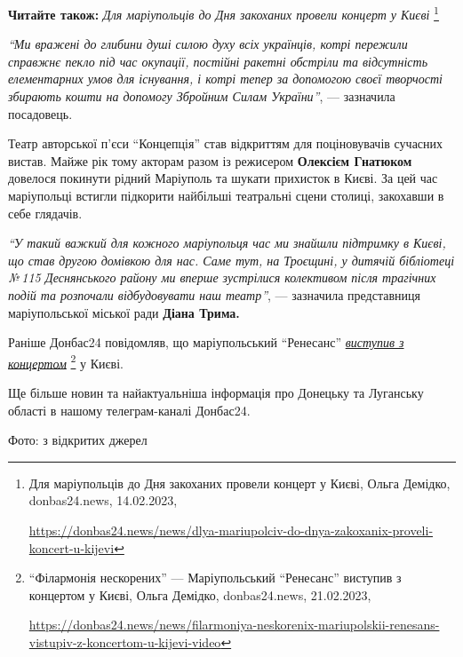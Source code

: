 \textbf{Читайте також:} \emph{Для маріупольців до Дня закоханих провели концерт у Києві}%
\footnote{Для маріупольців до Дня закоханих провели концерт у Києві, Ольга Демідко, donbas24.news, 14.02.2023, \par%
\url{https://donbas24.news/news/dlya-mariupolciv-do-dnya-zakoxanix-proveli-koncert-u-kijevi}%
}


\begin{leftbar}
\emph{\enquote{Ми вражені до глибини душі силою духу всіх українців, котрі пережили
справжнє пекло під час окупації, постійні ракетні обстріли та
відсутність елементарних умов для існування, і котрі тепер за допомогою
своєї творчості збирають кошти на допомогу Збройним Силам України}}, —
зазначила посадовець. 
\end{leftbar}


Театр авторської п'єси \enquote{Концепція} став відкриттям для поціновувачів сучасних
вистав. Майже рік тому акторам разом із режисером \textbf{Олексієм Гнатюком} довелося
покинути рідний Маріуполь та шукати прихисток в Києві. За цей час маріупольці
встигли підкорити найбільші театральні сцени столиці, закохавши в себе
глядачів.


\begin{leftbar}
\emph{\enquote{У такий важкий для кожного маріупольця час ми знайшли підтримку в Києві, що
став другою домівкою для нас. Саме тут, на Троєщині, у дитячій
бібліотеці № 115 Деснянського району ми вперше зустрілися колективом
після трагічних подій та розпочали відбудовувати наш театр}}, —
зазначила представниця маріупольської міської ради \textbf{Діана Трима.} 
\end{leftbar}


Раніше Донбас24 повідомляв, що маріупольський \enquote{Ренесанс} \href{https://donbas24.news/news/filarmoniya-neskorenix-mariupolskii-renesans-vistupiv-z-koncertom-u-kijevi-video}{\emph{виступив з концертом}}%
\footnote{\enquote{Філармонія нескорених} — Маріупольський \enquote{Ренесанс} виступив з концертом у Києві, Ольга Демідко, donbas24.news, 21.02.2023, \par\url{https://donbas24.news/news/filarmoniya-neskorenix-mariupolskii-renesans-vistupiv-z-koncertom-u-kijevi-video}}
у Києві.

Ще більше новин та найактуальніша інформація про Донецьку та Луганську області
в нашому телеграм-каналі Донбас24.

Фото: з відкритих джерел

